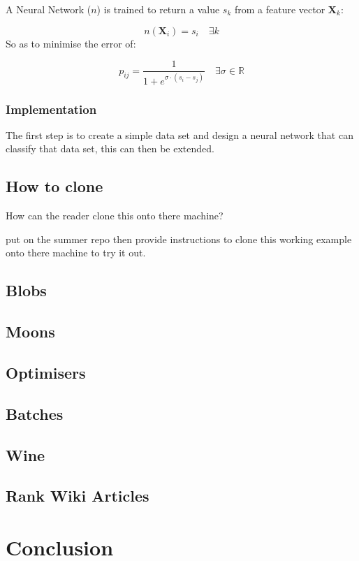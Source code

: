 \documentclass[a4paper,11pt,twoside]{article}
\begin{document}
A Neural Network (\(n\)) is trained to return a value
\(s_k\) from a feature vector \(\mathbf{X}_k\):

 \[n(\mathbf{X}_i) = s_i \quad \exists k\]
So as to minimise the error of:


\[
  p_{ij} = \frac{1}{1+e^{\sigma \cdot (s_i-s_j)}} \quad \exists \sigma
  \in \mathbb{R}
  \]

\subsubsection{Implementation}
\label{sec:org3a33cbd}
The first step is to create a simple data set and design a neural
network that can classify that data set, this can then be extended.

\subsection{How to clone}
\label{sec:orgb84f545}
How can the reader clone this onto there machine?

put on the summer repo then provide instructions to clone this
working example onto there machine to try it out.
\subsection{Blobs}
\label{sec:org4081e89}
\subsection{Moons}
\label{sec:org7508d66}
\subsection{Optimisers}
\label{sec:orgdac49a2}
\subsection{Batches}
\label{sec:orgdb25fc6}
\subsection{Wine}
\label{sec:org7ea0bde}
\subsection{Rank Wiki Articles}
\label{sec:orge2d26c2}

\section{Conclusion}
\label{sec:org62ac62d}
\end{document}
